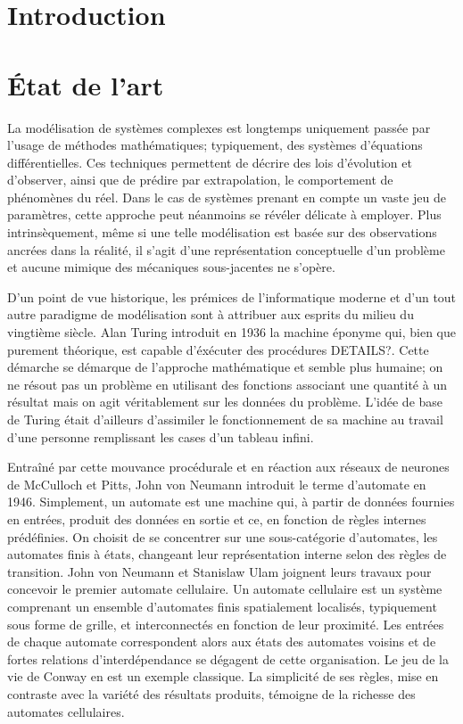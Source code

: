 \documentclass[10pt]{article}
\begin{document}
\begin{multicols}{2}

\section{Introduction}

\section{\'Etat de l'art}

La modélisation de systèmes complexes est longtemps uniquement passée
par l'usage de méthodes mathématiques; typiquement, des systèmes
d'équations différentielles. Ces techniques permettent de décrire des
lois d'évolution et d'observer, ainsi que de prédire par
extrapolation, le comportement de phénomènes du réel. Dans le cas de
systèmes prenant en compte un vaste jeu de paramètres, cette approche
peut néanmoins se révéler délicate à employer. Plus intrinsèquement,
même si une telle modélisation est basée sur des observations ancrées
dans la réalité, il s'agit d'une représentation conceptuelle d'un
problème et aucune mimique des mécaniques sous-jacentes ne s'opère.

D'un point de vue historique, les prémices de l'informatique moderne
et d'un tout autre paradigme de modélisation sont à attribuer aux
esprits du milieu du vingtième siècle. Alan Turing introduit en 1936
la machine éponyme qui, bien que purement théorique, est capable
d'éxécuter des procédures DETAILS?. Cette démarche se démarque de
l'approche mathématique et semble plus humaine; on ne résout pas un
problème en utilisant des fonctions associant une quantité à un
résultat mais on agit véritablement sur les données du
problème. L'idée de base de Turing était d'ailleurs d'assimiler le
fonctionnement de sa machine au travail d'une personne remplissant les
cases d'un tableau infini.

Entraîné par cette mouvance procédurale et en réaction aux réseaux de
neurones de McCulloch et Pitts, John von Neumann introduit le terme
d'automate en 1946. Simplement, un automate est une machine qui, à
partir de données fournies en entrées, produit des données en sortie
et ce, en fonction de règles internes prédéfinies. On choisit de se
concentrer sur une sous-catégorie d'automates, les automates finis à
états, changeant leur représentation interne selon des règles de
transition. John von Neumann et Stanislaw Ulam joignent leurs travaux
pour concevoir le premier automate cellulaire. Un automate cellulaire
est un système comprenant un ensemble d'automates finis spatialement
localisés, typiquement sous forme de grille, et interconnectés en
fonction de leur proximité. Les entrées de chaque automate
correspondent alors aux états des automates voisins et de fortes
relations d'interdépendance se dégagent de cette organisation. Le jeu
de la vie de Conway en est un exemple classique. La simplicité de ses
règles, mise en contraste avec la variété des résultats produits,
témoigne de la richesse des automates cellulaires.


\end{multicols}
\end{document}
